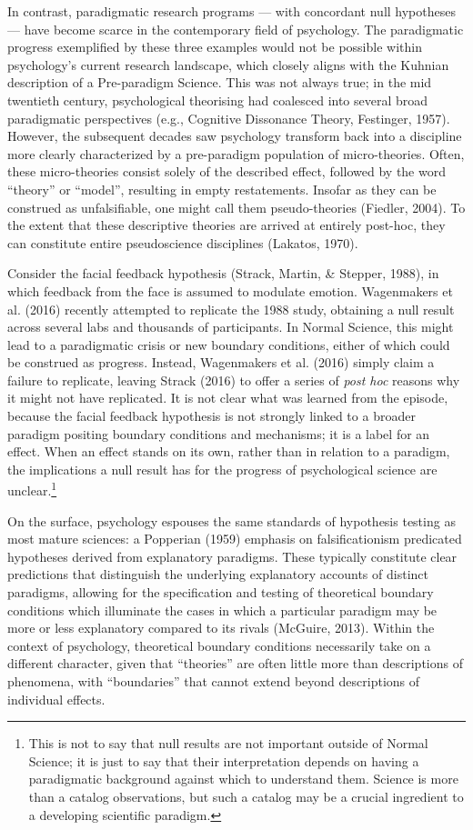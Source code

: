 \documentclass[english,floatsintext,man]{apa6}
\theoremstyle{definition}
\theoremstyle{definition}
\theoremstyle{definition}
\theoremstyle{remark}
\begin{document}
In contrast, paradigmatic research programs --- with concordant null
hypotheses --- have become scarce in the contemporary field of
psychology. The paradigmatic progress exemplified by these three
examples would not be possible within psychology's current research
landscape, which closely aligns with the Kuhnian description of a
Pre-paradigm Science. This was not always true; in the mid twentieth
century, psychological theorising had coalesced into several broad
paradigmatic perspectives (e.g., Cognitive Dissonance Theory, Festinger,
1957). However, the subsequent decades saw psychology transform back
into a discipline more clearly characterized by a pre-paradigm
population of micro-theories. Often, these micro-theories consist solely
of the described effect, followed by the word \enquote{theory} or
\enquote{model}, resulting in empty restatements. Insofar as they can be
construed as unfalsifiable, one might call them pseudo-theories
(Fiedler, 2004). To the extent that these descriptive theories are
arrived at entirely post-hoc, they can constitute entire pseudoscience
disciplines (Lakatos, 1970).

Consider the facial feedback hypothesis (Strack, Martin, \& Stepper,
1988), in which feedback from the face is assumed to modulate emotion.
Wagenmakers et al. (2016) recently attempted to replicate the 1988
study, obtaining a null result across several labs and thousands of
participants. In Normal Science, this might lead to a paradigmatic
crisis or new boundary conditions, either of which could be construed as
progress. Instead, Wagenmakers et al. (2016) simply claim a failure to
replicate, leaving Strack (2016) to offer a series of \emph{post hoc}
reasons why it might not have replicated. It is not clear what was
learned from the episode, because the facial feedback hypothesis is not
strongly linked to a broader paradigm positing boundary conditions and
mechanisms; it is a label for an effect. When an effect stands on its
own, rather than in relation to a paradigm, the implications a null
result has for the progress of psychological science are
unclear.\footnote{This is not to say that null results are not important
  outside of Normal Science; it is just to say that their interpretation
  depends on having a paradigmatic background against which to
  understand them. Science is more than a catalog observations, but such
  a catalog may be a crucial ingredient to a developing scientific
  paradigm.}

On the surface, psychology espouses the same standards of hypothesis
testing as most mature sciences: a Popperian (1959) emphasis on
falsificationism predicated hypotheses derived from explanatory
paradigms. These typically constitute clear predictions that distinguish
the underlying explanatory accounts of distinct paradigms, allowing for
the specification and testing of theoretical boundary conditions which
illuminate the cases in which a particular paradigm may be more or less
explanatory compared to its rivals (McGuire, 2013). Within the context
of psychology, theoretical boundary conditions necessarily take on a
different character, given that \enquote{theories} are often little more
than descriptions of phenomena, with \enquote{boundaries} that cannot
extend beyond descriptions of individual effects.
\end{document}
